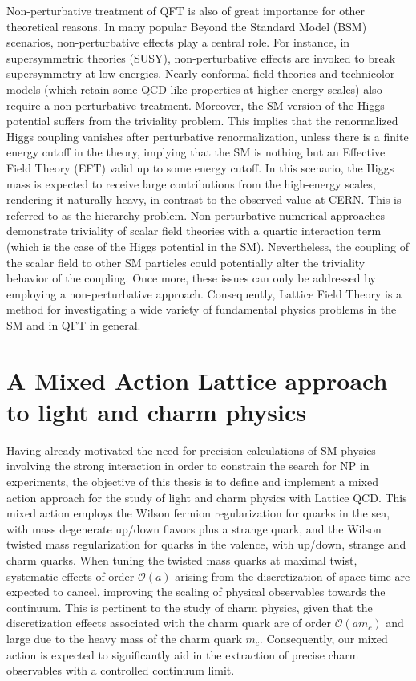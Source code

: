 Non-perturbative treatment of QFT is also of great importance for other theoretical reasons. In many popular Beyond the Standard Model (BSM) scenarios, non-perturbative effects play a central role. For instance, in supersymmetric theories (SUSY), non-perturbative effects are invoked to break supersymmetry at low energies. Nearly conformal field theories and technicolor models (which retain some QCD-like properties at higher energy scales) also require a non-perturbative treatment.  Moreover, the SM version of the Higgs potential suffers from the triviality problem. This implies that the renormalized Higgs coupling vanishes after perturbative renormalization, unless there is a finite energy cutoff in the theory, implying that the SM is nothing but an Effective Field Theory (EFT) valid up to some energy cutoff. In this scenario, the Higgs mass is expected to receive large contributions from the high-energy scales, rendering it naturally heavy, in contrast to the observed value at CERN. This is referred to as the hierarchy problem. Non-perturbative numerical approaches demonstrate triviality of scalar field theories with a quartic interaction term~\citep{Luscher:1987ek} (which is the case of the Higgs potential in the SM). Nevertheless, the coupling of the scalar field to other SM particles could potentially alter the triviality behavior of the coupling. Once more, these issues can only be addressed by employing a non-perturbative approach. Consequently, Lattice Field Theory is a method for investigating a wide variety of fundamental physics problems in the SM and in QFT in general.

\section*{A Mixed Action Lattice approach to light and charm physics}

Having already motivated the need for precision calculations of SM physics involving the strong interaction in order to constrain the search for NP in experiments, the objective of this thesis is to define and implement a mixed action approach for the study of light and charm physics with Lattice QCD. This mixed action employs the Wilson fermion regularization for quarks in the sea, with mass degenerate up/down flavors plus a strange quark, and the Wilson twisted mass regularization for quarks in the valence, with up/down, strange and charm quarks. When tuning the twisted mass quarks at maximal twist, systematic effects of order $\mathcal{O}(a)$ arising from the discretization of space-time are expected to cancel, improving the scaling of physical observables towards the continuum. This is pertinent to the study of charm physics, given that the discretization effects associated with the charm quark are of order $\mathcal{O}(am_c)$ and large due to the heavy mass of the charm quark $m_c$. Consequently, our mixed action is expected to significantly aid in the extraction of precise charm observables with a controlled continuum limit.


